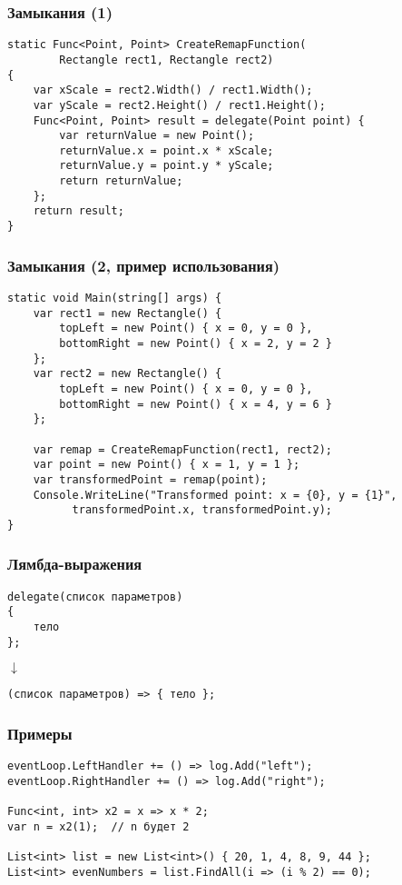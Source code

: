 \documentclass[xetex,mathserif,serif]{beamer}
\begin{document}
	\begin{frame}[fragile]
		\frametitle{Замыкания (1)}
		\begin{verbatim}
static Func<Point, Point> CreateRemapFunction(
        Rectangle rect1, Rectangle rect2)
{
    var xScale = rect2.Width() / rect1.Width();
    var yScale = rect2.Height() / rect1.Height();
    Func<Point, Point> result = delegate(Point point) {
        var returnValue = new Point();
        returnValue.x = point.x * xScale;
        returnValue.y = point.y * yScale;
        return returnValue;
    };
    return result;
}
		\end{verbatim}
	\end{frame}

	\begin{frame}[fragile]
		\frametitle{Замыкания (2, пример использования)}
		\begin{small}
			\begin{verbatim}
static void Main(string[] args) {
    var rect1 = new Rectangle() {
        topLeft = new Point() { x = 0, y = 0 },
        bottomRight = new Point() { x = 2, y = 2 }
    };
    var rect2 = new Rectangle() {
        topLeft = new Point() { x = 0, y = 0 },
        bottomRight = new Point() { x = 4, y = 6 }
    };

    var remap = CreateRemapFunction(rect1, rect2);
    var point = new Point() { x = 1, y = 1 };
    var transformedPoint = remap(point);
    Console.WriteLine("Transformed point: x = {0}, y = {1}", 
          transformedPoint.x, transformedPoint.y);
}
			\end{verbatim}
		\end{small}
	\end{frame}

	\begin{frame}[fragile]
		\frametitle{Лямбда-выражения}
		\begin{verbatim}
delegate(список параметров)
{
    тело
};
		\end{verbatim}
		\hspace{2cm}\begin{LARGE}$\downarrow$\end{LARGE}
		\begin{verbatim}
(список параметров) => { тело };
		\end{verbatim}
	\end{frame}

	\begin{frame}[fragile]
		\frametitle{Примеры}
		\begin{verbatim}
eventLoop.LeftHandler += () => log.Add("left");
eventLoop.RightHandler += () => log.Add("right");

Func<int, int> x2 = x => x * 2;
var n = x2(1);  // n будет 2

List<int> list = new List<int>() { 20, 1, 4, 8, 9, 44 };
List<int> evenNumbers = list.FindAll(i => (i % 2) == 0);
		\end{verbatim}
	\end{frame}
\end{document}
